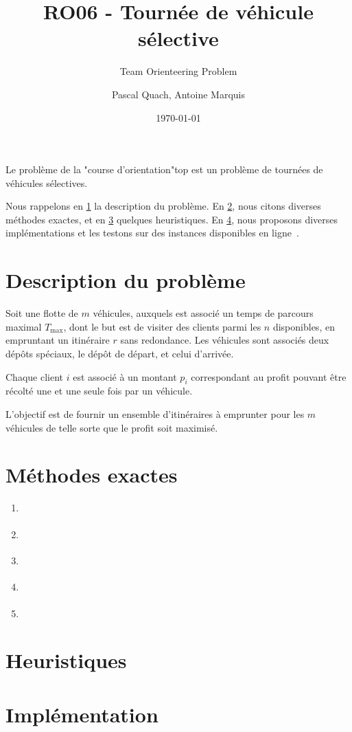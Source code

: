 \documentclass[a4paper]{scrartcl}
\title{RO06 - Tournée de véhicule sélective}
\subtitle{Team Orienteering Problem}
\author{Pascal Quach, Antoine Marquis}
\date{\today}
\begin{document}
\maketitle

Le problème de la "course d'orientation"\textemdash \gls{top} \textemdash est
un problème de tournées de véhicules sélectives.

Nous rappelons en \cref{sec:top-description} la description du problème. En
\cref{sec:méthodes-exactes}, nous citons diverses méthodes exactes, et en
\cref{sec:heuristiques} quelques heuristiques. En \cref{sec:implementation},
nous proposons diverses implémentations et les testons sur des instances
disponibles en ligne~\cite{cib_test_instances,chao_1993,chao.etal_feb1996,tsiligirides_sep1984}.

\section{Description du problème}%
\label{sec:top-description}

Soit une flotte de $m$ véhicules, auxquels est associé un temps de parcours
maximal $T_{\max}$, dont le but est de visiter des clients parmi les $n$
disponibles, en empruntant un itinéraire $r$ sans redondance. Les véhicules
sont associés deux dépôts spéciaux, le dépôt de départ, et celui d'arrivée.

Chaque client $i$ est associé à un montant $p_i$ correspondant au profit
pouvant être récolté une et une seule fois par un véhicule.

L'objectif est de fournir un ensemble d'itinéraires à emprunter pour les $m$
véhicules de telle sorte que le profit soit maximisé.

\section{Méthodes exactes}%
\label{sec:méthodes-exactes}

\begin{enumerate}
	\item \cite{butt.ryan_apr1999}
	\item \cite{boussier.etal_sep2007} 
	\item \cite{poggi.etal_2010}
	\item \cite{dang.etal_may2013}
	\item \cite{keshtkaran.etal_jan2016}
\end{enumerate}

\section{Heuristiques}%
\label{sec:heuristiques}

\section{Implémentation}
\label{sec:implementation}

\printnoidxglossary[type=acronym]
\printbibliography
\end{document}
